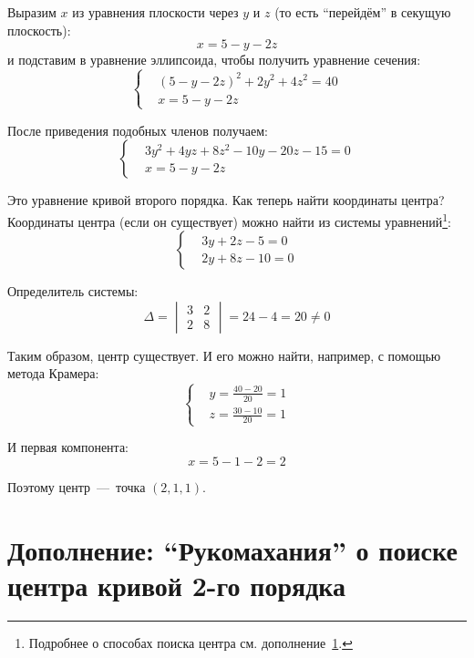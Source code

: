 \documentclass[a4paper,12pt]{article}
\begin{document}
  \begin{solution}
    Выразим $x$ из уравнения плоскости через $y$ и $z$ (то есть ``перейдём'' в секущую плоскость):
    \[
      x = 5 - y - 2z
    \]
    и подставим в уравнение эллипсоида, чтобы получить уравнение сечения:
    \[
      \left\{
        \begin{aligned}
          &(5 - y - 2z)^2 + 2y^2 + 4z^2 = 40\\
          &x = 5 - y - 2z
        \end{aligned}
      \right.
    \]
    
    После приведения подобных членов получаем:
    \[
      \left\{
        \begin{aligned}
          &3y^2 + 4yz + 8z^2 - 10y - 20z - 15 = 0\\
          &x = 5 - y - 2z
        \end{aligned}
      \right.
    \]
    
    Это уравнение кривой второго порядка.
    Как теперь найти координаты центра?
    Координаты центра (если он существует) можно найти из системы уравнений\footnote{Подробнее о способах поиска центра см. дополнение~\ref{seq:about-ways}.}:
    \[
      \left\{
        \begin{aligned}
          &3y + 2z - 5 = 0\\
          &2y + 8z - 10 = 0
        \end{aligned}
      \right.
    \]
    
    Определитель системы:
    \[
      \Delta = \begin{vmatrix} 3 & 2 \\ 2 & 8 \end{vmatrix} = 24 - 4 = 20 \not= 0
    \]
    
    Таким образом, центр существует.
    И его можно найти, например, с помощью метода Крамера:
    \[
      \left\{
        \begin{aligned}
          &y = \frac{40 - 20}{20} = 1\\
          &z = \frac{30 - 10}{20} = 1
        \end{aligned}
      \right.
    \]
    
    И первая компонента:
    \[
      x = 5 - 1 - 2 = 2
    \]
    
    Поэтому центр~---~точка $(2, 1, 1)$.
  \end{solution}
  
  
  \section{Дополнение: ``Рукомахания'' о поиске центра кривой 2-го порядка}
  \label{seq:about-ways}
  
\end{document}
